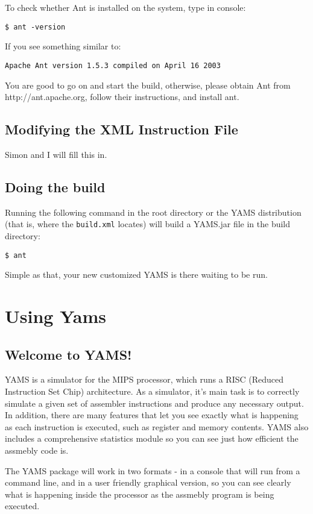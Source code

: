 \documentclass[12pt]{report}
\begin{document}
To check whether Ant is installed on the system, type in
console:

\texttt{\$ ant -version}

If you see something similar to:

\texttt{Apache Ant version 1.5.3 compiled on April 16 2003}

You are good to go on and start the build, otherwise, please
obtain Ant from http://ant.apache.org, follow their instructions,
and install ant.

\section{Modifying the XML Instruction File}

Simon and I will fill this in.

\section{Doing the build}

Running the following command in the root directory or the YAMS
distribution (that is, where the \texttt{build.xml} locates) will
build a YAMS.jar file in the build directory:

\texttt{\$ ant}

Simple as that, your new customized YAMS is there waiting to be
run.

\chapter{Using Yams}

\section{Welcome to YAMS!}

YAMS is a simulator for the MIPS processor, which runs a RISC (Reduced Instruction Set Chip) architecture.  As a simulator, it's main task is to correctly simulate a given set of assembler instructions and produce any necessary output.  In addition, there are many features that let you see exactly what is happening as each instruction is executed, such as register and memory contents.  YAMS also includes a comprehensive statistics module so you can see just how efficient the assmebly code is.

The YAMS package will work in two formats - in a console that will run from a command line, and in a user friendly graphical version, so you can see clearly what is happening inside the processor as the assmebly program is being executed.
\end{document}
